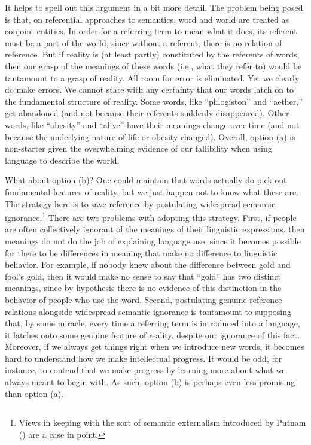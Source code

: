 It helps to spell out this argument in a bit more detail. The problem being posed is that, on referential approaches to semantics, word and world are treated as conjoint entities. In order for a referring term to mean what it does, its referent must be a part of the world, since without a referent, there is no relation of reference. But if reality is (at least partly) constituted by the referents of words, then our grasp of the meanings of these words (i.e., what they refer to) would be tantamount to a grasp of reality. All room for error is eliminated. Yet we clearly do make errors. We cannot state with any certainty that our words latch on to the fundamental structure of reality. Some words, like ``phlogiston'' and ``aether,'' get abandoned (and not because their referents suddenly disappeared). Other words, like ``obesity'' and ``alive'' have their meanings change over time (and not because the underlying nature of life or obesity changed). Overall, option (a) is non-starter given the overwhelming evidence of our fallibility when using language to describe the world.

What about option (b)? One could maintain that words actually do pick out fundamental features of reality, but we just happen not to know what these are. The strategy here is to save reference by postulating widespread semantic ignorance.\footnote{Views in keeping with the sort of semantic externalism introduced by Putnam (\citeyear{Putnam:1975}) are a case in point.} There are two problems with adopting this strategy. First, if people are often collectively ignorant of the meanings of their linguistic expressions, then meanings do not do the job of explaining language use, since it becomes possible for there to be differences in meaning that make no difference to linguistic behavior. For example, if nobody knew about the difference between gold and fool's gold, then it would make no sense to say that ``gold'' has two distinct meanings, since by hypothesis there is no evidence of this distinction in the behavior of people who use the word. Second, postulating genuine reference relations alongside widespread semantic ignorance is tantamount to supposing that, by some miracle, every time a referring term is introduced into a language, it latches onto some genuine feature of reality, despite our ignorance of this fact. Moreover, if we always get things right when we introduce new words, it becomes hard to understand how we make intellectual progress. It would be odd, for instance, to contend that we make progress by learning more about what we always meant to begin with. As such, option (b) is perhaps even less promising than option (a).

